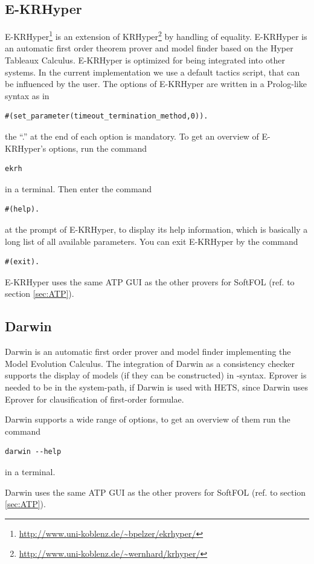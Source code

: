 \documentclass{article}
\newcommand{\normalTEXTSC}[2]{{#1\scriptsize#2}}
\newcommand     {\Hets}{\normalTEXTSC{H}{ETS}\xspace}
\begin{document}
\subsection{E-KRHyper}
E-KRHyper\footnote{\url{http://www.uni-koblenz.de/~bpelzer/ekrhyper/}}
is an extension of
KRHyper\footnote{\url{http://www.uni-koblenz.de/~wernhard/krhyper/}} by
handling of equality. E-KRHyper is an automatic first order theorem
prover and model finder based on the Hyper Tableaux Calculus\cite{Baumgartner:1996}.
E-KRHyper is optimized for being integrated into other systems. In the current
implementation we use a default tactics script, that can be influenced by the user.
The options of E-KRHyper are written in a Prolog-like syntax as in
\begin{verbatim}
#(set_parameter(timeout_termination_method,0)).
\end{verbatim}
the ``.'' at the end of each option is mandatory. To get an overview of
E-KRHyper's options, run the command
\begin{verbatim}
ekrh
\end{verbatim}
in a terminal. Then enter the command
\begin{verbatim}
#(help).
\end{verbatim}
at the prompt of E-KRHyper, to display its help information, which is basically
a long list of all available parameters. You can exit E-KRHyper by the command
\begin{verbatim}
#(exit).
\end{verbatim}

E-KRHyper uses the same ATP GUI as the other provers for SoftFOL (ref. to section
\ref{sec:ATP}).
\subsection{Darwin}
Darwin is an automatic first order prover and model finder implementing the Model
Evolution
Calculus\cite{Baumgartner:2003}. The integration of Darwin as a consistency checker
supports the display of models (if they can be constructed) in \CASL-syntax.
Eprover is needed to be in the system-path, if Darwin is used with \Hets, since
Darwin uses Eprover for clausification of first-order formulae.

Darwin supports a wide range of options, to get an overview of them run the command
\begin{verbatim}
darwin --help
\end{verbatim}
in a terminal.

Darwin uses the same ATP GUI as the other provers for SoftFOL (ref. to section
\ref{sec:ATP}).
\end{document}
